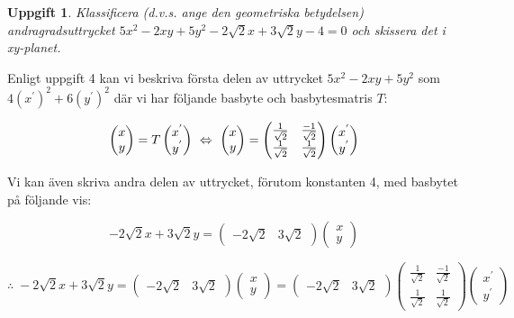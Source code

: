 \documentclass{article}
\newtheorem{thr}{Uppgift}
\begin{document}
\newpage

\begin{thr}
    Klassificera (d.v.s. ange den geometriska betydelsen) andragradsuttrycket $5x^2-2xy+5y^2-2\sqrt{2}x+3\sqrt{2}y-4=0$ och skissera det i xy-planet.
\end{thr}

\vskip 0.3cm

Enligt uppgift 4 kan vi beskriva första delen av uttrycket $5x^2-2xy+5y^2$ som $4(x^{'})^2+6(y^{'})^2$ där vi har följande basbyte och basbytesmatris $T$:

$$
\begin{pmatrix}
    x \\
    y
\end{pmatrix}
=
T
\begin{pmatrix}
    x^{'} \\
    y^{'}
\end{pmatrix}
\ \Leftrightarrow \ 
\begin{pmatrix}
    x \\
    y
\end{pmatrix}
=
\begin{pmatrix}
    \frac{1}{\sqrt{2}} & \frac{-1}{\sqrt{2}} \\
    \frac{1}{\sqrt{2}} & \frac{1}{\sqrt{2}}
\end{pmatrix}
\begin{pmatrix}
    x^{'} \\
    y^{'}
\end{pmatrix}
$$

\vskip 0.3cm

Vi kan även skriva andra delen av uttrycket, förutom konstanten 4, med basbytet på följande vis:

$$
-2\sqrt{2}x+3\sqrt{2}y=
\begin{pmatrix}
    -2\sqrt{2} & 3\sqrt{2}
\end{pmatrix}
\begin{pmatrix}
    x \\
    y
\end{pmatrix}
$$

\vskip 0.3cm

$$
\therefore
\;
-2\sqrt{2}x+3\sqrt{2}y=
\begin{pmatrix}
    -2\sqrt{2} & 3\sqrt{2}
\end{pmatrix}
\begin{pmatrix}
    x \\
    y
\end{pmatrix}
=
\begin{pmatrix}
    -2\sqrt{2} & 3\sqrt{2}
\end{pmatrix}
\begin{pmatrix}
    \frac{1}{\sqrt{2}} & \frac{-1}{\sqrt{2}} \\
    \frac{1}{\sqrt{2}} & \frac{1}{\sqrt{2}}
\end{pmatrix}
\begin{pmatrix}
    x^{'} \\
    y^{'}
\end{pmatrix}
$$
\end{document}
